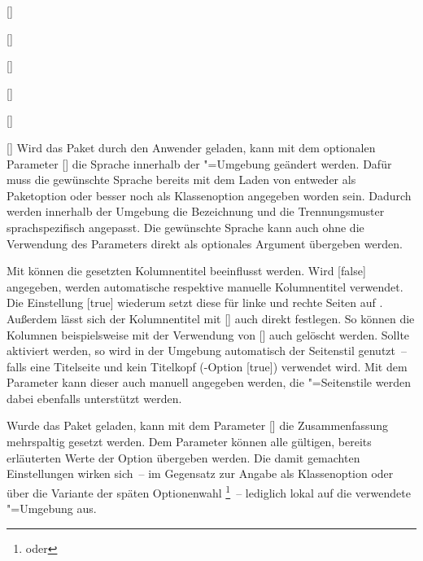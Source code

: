 \documentclass[english,ngerman,ToDo=no]{tudscrman3}
\begin{document}
\begin{Declaration}{[]}
\begin{Declaration}[v2.02]{}
\begin{Declaration}{[]}
\begin{Declaration}[v2.02]{%
  []%
}
\begin{Declaration}[v2.02]{%
  []%
}
\begin{Declaration}{[]}
\begin{Declaration}{[\PSet]}{%
}
Wird das Paket  durch den Anwender geladen, kann mit dem 
optionalen Parameter [] 
die Sprache innerhalb der "=Umgebung geändert werden. 
Dafür muss die gewünschte Sprache bereits mit dem Laden von  
entweder als Paketoption oder besser noch als Klassenoption angegeben worden 
sein. Dadurch werden innerhalb der Umgebung die Bezeichnung  
und die Trennungsmuster sprachspezifisch angepasst. Die gewünschte Sprache kann 
auch ohne die Verwendung des Parameters  
direkt als optionales Argument übergeben werden.

Mit  können die gesetzten Kolumnentitel 
beeinflusst werden. Wird [false] 
angegeben, werden automatische respektive manuelle Kolumnentitel verwendet. Die 
Einstellung [true] wiederum setzt diese 
für linke und rechte Seiten auf . Außerdem lässt sich der 
Kolumnentitel mit [] 
auch direkt festlegen. So können die Kolumnen beispielsweise mit der Verwendung 
von [\PParameter{}] auch gelöscht werden. 
Sollte  aktiviert werden, so wird in der
Umgebung automatisch der Seitenstil  genutzt~-- falls eine 
Titelseite und kein Titelkopf (\KOMAScript-Option [true]) 
verwendet wird. Mit dem Parameter  kann 
dieser auch manuell angegeben werden, die "=Seitenstile 
werden dabei ebenfalls unterstützt werden.

Wurde das Paket  geladen, kann mit dem Parameter 
[] die Zusammenfassung 
mehrspaltig gesetzt werden. Dem Parameter  
können alle gültigen, bereits erläuterten Werte der Option  
übergeben werden. Die damit gemachten Einstellungen wirken sich~-- im Gegensatz 
zur Angabe als Klassenoption oder über die Variante der späten Optionenwahl%
\footnote{%
   oder
}~-- lediglich lokal auf die verwendete "=Umgebung aus.


\end{Declaration}
\end{Declaration}
\end{Declaration}
\end{Declaration}
\end{Declaration}
\end{Declaration}
\end{Declaration}
\end{document}
